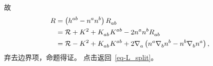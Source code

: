 \begin{Proof}
			故
			\begin{equation*}
				\begin{split}
					R &= \left( \tensor{h}{^a^b} - \tensor{n}{^a}\tensor{n}{^b} \right) \tensor{R}{_a_b}\\
					&= \spacecurR + K^2 + \tensor{K}{_a_b} \tensor{K}{^a^b} - 2 \tensor{n}{^a} \tensor{n}{^b} \tensor{R}{_a_b}\\
					&= \spacecurR - K^2 + \tensor{K}{_a_b} \tensor{K}{^a^b} + 2 \Nabla{a} \left( \tensor{n}{^a} \Nabla{b} \tensor{n}{^b} - \tensor{n}{^b} \Nabla{b} \tensor{n}{^a} \right),
				\end{split}
			\end{equation*}
			弃去边界项，命题得证。
			{\normalfont\ttfamily\color{green} 点击返回~\eqref{eq-L_split}。}
		\end{Proof}
